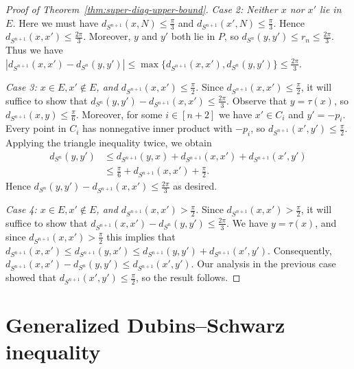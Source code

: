 \documentclass[11pt, reqno, english]{amsart}
\begin{document}
\begin{proof}[Proof of Theorem~\ref{thm:super-diag-upper-bound}]
\noindent \emph{Case 2: Neither $x$ nor $x'$ lie in $E$.}
Here we must have $d_{S^{n+1}}(x, N)\le \tfrac{\pi}{3}$ and $d_{S^{n+1}}(x', N)\le \tfrac{\pi}{3}$.
Hence $d_{S^{n+1}}(x,x')\le \tfrac{2\pi}{3}$.
Moreover, $y$ and $y'$ both lie in $P$, so $d_{S^{n}}(y,y')\le r_n \le \tfrac{2\pi}{3}$.
Thus we have $|d_{S^{n+1}}(x,x') - d_{S^{n}}(y,y')| \le \max\{d_{S^{n+1}}(x,x'), d_{S^{n}}(y,y')\} \le \tfrac{2\pi}{3}$.
\smallskip

\noindent \emph{Case 3: $x\in E, x'\notin E$, and $d_{S^{n+1}}(x,x')\le \tfrac{\pi}{2}$.}
Since $d_{S^{n+1}}(x,x')\le \tfrac{\pi}{2}$, it will suffice to show that $d_{S^{n}}(y,y')-d_{S^{n+1}}(x,x')\le \tfrac{2\pi}{3}$.
Observe that $y = \tau(x)$, so $d_{S^{n+1}}(x,y)\le \tfrac{\pi}{6}$.
Moreover, for some $i\in[n+2]$ we have $x'\in C_i$ and $y'=-p_i$.
Every point in $C_i$ has nonnegative inner product with $-p_i$, so $d_{S^{n+1}}(x',y')\le \tfrac{\pi}{2}$.
Applying the triangle inequality twice, we obtain 
\begin{align*}
    d_{S^{n}}(y,y') &\le d_{S^{n+1}}(y,x) + d_{S^{n+1}}(x,x') + d_{S^{n+1}}(x',y')\\
    &\le \tfrac{\pi}{6} + d_{S^{n+1}}(x,x') + \tfrac{\pi}{2} .
\end{align*}
Hence $d_{S^{n}}(y,y')-d_{S^{n+1}}(x,x')\le \tfrac{2\pi}{3}$ as desired.\smallskip

\noindent \emph{Case 4: $x\in E, x'\notin E$, and $d_{S^{n+1}}(x,x') > \tfrac{\pi}{2}$.}
Since $d_{S^{n+1}}(x,x') > \tfrac{\pi}{2}$, it will suffice to show that $d_{S^{n+1}}(x,x') - d_{S^{n}}(y,y') \le \tfrac{2\pi}{3}$.
We have $y= \tau(x)$, and since $d_{S^{n+1}}(x,x')> \tfrac{\pi}{2}$ this implies that $d_{S^{n+1}}(x,x') \le d_{S^{n+1}}(y,x') \le d_{S^{n+1}}(y,y') + d_{S^{n+1}}(x',y')$.
Consequently, $d_{S^{n+1}}(x,x') - d_{S^{n}}(y,y') \le d_{S^{n+1}}(x',y')$.
Our analysis in the previous case showed that $d_{S^{n+1}}(x',y')\le \tfrac{\pi}{2}$, so the result follows.
\end{proof}



\section{Generalized Dubins--Schwarz inequality}
\label{sec:gen-ds}
\end{document}
